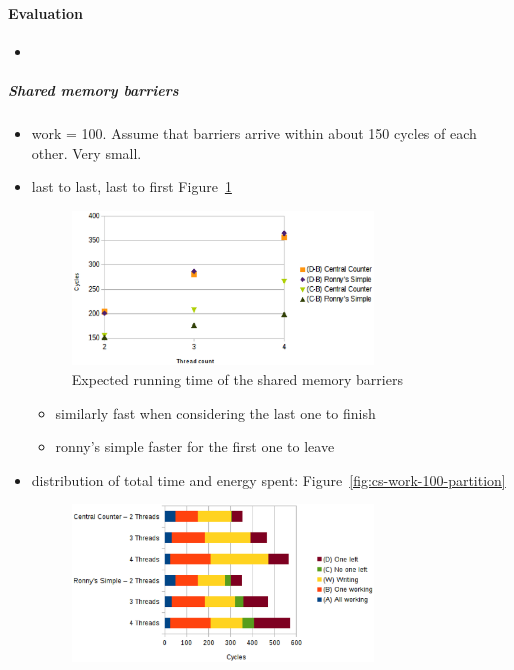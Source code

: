 \documentclass[a4paper, 10pt]{article}
\begin{document}
\paragraph{Evaluation}
\label{ssssec:analysis-modelchecking-quantitative-properties-results}
\begin{itemize}
	\item 
\end{itemize}

\subparagraph{Shared memory barriers}
\label{sssssec:analysis-modelchecking-quantitative-properties-results-shared}
\begin{itemize}
	\item work = 100. Assume that barriers arrive within about 150 cycles of each other. Very small.
	\item last to last, last to first Figure~\ref{fig:cs-time-work-100-B-C-D}
		\begin{figure}[htbp]
			\centering
			\includegraphics[width=8cm]{charts/cs-time-work-100-B-C-D}
			\caption{Expected running time of the shared memory barriers}
			\label{fig:cs-time-work-100-B-C-D}
		\end{figure}
		\begin{itemize}
			\item similarly fast when considering the last one to finish
			\item ronny's simple faster for the first one to leave
		\end{itemize}
	\item distribution of total time and energy spent: Figure~\ref{fig:cs-work-100-partition}
		\begin{figure}[htbp]
			\centering
			\includegraphics[width=8cm]{charts/cs-time-work-100-partition}

\end{figure}
\end{itemize}
\end{document}
